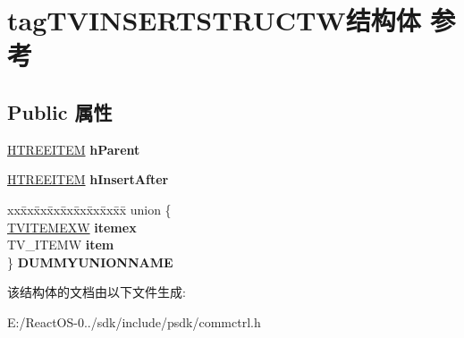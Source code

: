 \hypertarget{structtag_t_v_i_n_s_e_r_t_s_t_r_u_c_t_w}{}\section{tag\+T\+V\+I\+N\+S\+E\+R\+T\+S\+T\+R\+U\+C\+T\+W结构体 参考}
\label{structtag_t_v_i_n_s_e_r_t_s_t_r_u_c_t_w}
\subsection*{Public 属性}
\begin{DoxyCompactItemize}
\item 
\mbox{\label{structtag_t_v_i_n_s_e_r_t_s_t_r_u_c_t_w_ab26cbf98d470d84ea3039e095f14d0f6}} 
\hyperlink{struct___t_r_e_e_i_t_e_m}{H\+T\+R\+E\+E\+I\+T\+EM} {\bfseries h\+Parent}
\item 
\mbox{\label{structtag_t_v_i_n_s_e_r_t_s_t_r_u_c_t_w_af5361e702b1d22b96786c0f851181b10}} 
\hyperlink{struct___t_r_e_e_i_t_e_m}{H\+T\+R\+E\+E\+I\+T\+EM} {\bfseries h\+Insert\+After}
\item 
\mbox{\label{structtag_t_v_i_n_s_e_r_t_s_t_r_u_c_t_w_a2bc1944fa33ce2d982929b8a702a19ba}} 
\begin{tabbing}
xx\=xx\=xx\=xx\=xx\=xx\=xx\=xx\=xx\=\kill
union \{\\
\>\hyperlink{structtag_t_v_i_t_e_m_e_x_w}{TVITEMEXW} {\bfseries itemex}\\
\>TV\_ITEMW {\bfseries item}\\
\} {\bfseries DUMMYUNIONNAME}\\

\end{tabbing}\end{DoxyCompactItemize}


该结构体的文档由以下文件生成\+:\begin{DoxyCompactItemize}
\item 
E\+:/\+React\+O\+S-\/0../sdk/include/psdk/commctrl.\+h\end{DoxyCompactItemize}
